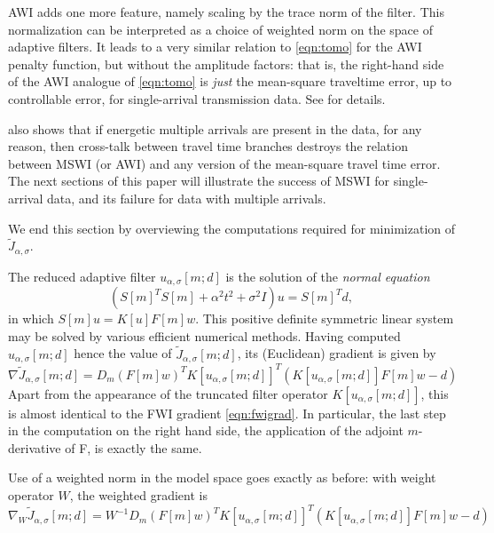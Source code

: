 AWI adds one more feature, namely scaling by the trace norm of the
filter. This normalization can be interpreted as a choice of weighted
norm on the space of adaptive filters. It leads to a very similar
relation to \ref{eqn:tomo} for the AWI penalty function, but without
the amplitude factors: that is, the right-hand side of the AWI
analogue of \ref{eqn:tomo}
is {\em just} the mean-square traveltime error, up to controllable
error, for single-arrival transmission data. See \cite{Symes:24a}
for details.

\cite{Symes:24a} also shows that if energetic multiple arrivals are
present in the data, for any reason, then cross-talk between travel
time branches destroys the relation between MSWI (or AWI) and any
version of the mean-square travel time error. The next sections of
this paper will illustrate the
success of MSWI for single-arrival data, and its failure for data with
multiple arrivals.

We end this section by overviewing the computations required for
minimization of $\tilde{J}_{\alpha,\sigma}$.

The reduced adaptive filter $u_{\alpha,\sigma}[m;d]$ is the solution
of the {\em normal equation}
\begin{equation}
  \label{eqn:normal}
  (S[m]^TS[m] + \alpha^2 t^2 + \sigma^2 I)u = S[m]^Td,
\end{equation}
in which $S[m]u = K[u]F[m]w$. This positive definite symmetric linear
system may be solved by various efficient numerical methods. Having
computed $u_{\alpha,\sigma}[m;d]$ hence the value of 
$\tilde{J}_{\alpha,\sigma}[m;d]$, its (Euclidean) gradient is given by
\begin{equation}
  \label{eqn:gradredfiltpen}
  \nabla \tilde{J}_{\alpha,\sigma}[m;d] =
  D_m(F[m]w)^TK[u_{\alpha,\sigma}[m;d]]^T(K[u_{\alpha,\sigma}[m;d]]F[m]w-d)
\end{equation}
Apart from the appearance of the truncated filter operator
$K[u_{\alpha,\sigma}[m;d]]$, this is almost identical to the FWI
gradient \ref{eqn:fwigrad}. In particular, the last step in the
computation on the right hand side, the application of the adjoint
$m$-derivative of F, is exactly the same.

Use of a weighted norm in the model space goes exactly as before: with
weight operator $W$, the weighted gradient is
\begin{equation}
  \label{eqn:wgradredfiltpen}
  \nabla_W \tilde{J}_{\alpha,\sigma}[m;d] =
  W^{-1}D_m(F[m]w)^TK[u_{\alpha,\sigma}[m;d]]^T(K[u_{\alpha,\sigma}[m;d]]F[m]w-d)
\end{equation}


